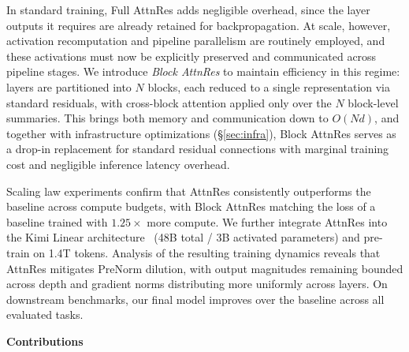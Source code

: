 In standard training, Full AttnRes adds negligible overhead, since the layer outputs it requires are already retained for backpropagation. At scale, however, activation recomputation and pipeline parallelism are routinely employed, and these activations must now be explicitly preserved and communicated across pipeline stages. We introduce \textit{Block AttnRes} to maintain efficiency in this regime: layers are partitioned into $N$ blocks, each reduced to a single representation via standard residuals, with cross-block attention applied only over the $N$ block-level summaries. This brings both memory and communication down to $O(Nd)$, and together with infrastructure optimizations (\S\ref{sec:infra}), Block AttnRes serves as a drop-in replacement for standard residual connections with marginal training cost and negligible inference latency overhead.

Scaling law experiments confirm that AttnRes consistently outperforms the baseline across compute budgets, with Block AttnRes matching the loss of a baseline trained with $1.25\times$ more compute. We further integrate AttnRes into the Kimi Linear architecture~\cite{zhang2025kimi} (48B total / 3B activated parameters) and pre-train on 1.4T tokens. Analysis of the resulting training dynamics reveals that AttnRes mitigates PreNorm dilution, with output magnitudes remaining bounded across depth and gradient norms distributing more uniformly across layers. On downstream benchmarks, our final model improves over the baseline across all evaluated tasks.

\textbf{Contributions}

